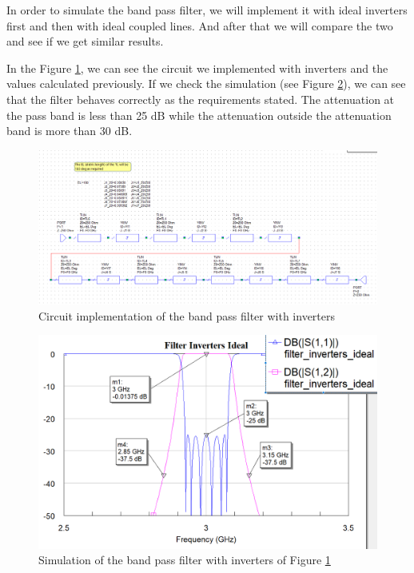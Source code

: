 \documentclass[12pt]{report} %
\begin{document}
In order to simulate the band pass filter, we will implement it with ideal inverters first and then with ideal coupled lines. And after that we will compare the two and see if we get similar results.

In the Figure \ref{fig:design_circuit_elements:band_pass_filter_inverters_circuit}, we can see the circuit we implemented with inverters and the values calculated previously. If we check the simulation (see Figure \ref{fig:design_circuit_elements:band_pass_fitlter_inverters_graph}), we can see that the filter behaves correctly as the requirements stated. The attenuation at the pass band is less than 25 dB while the attenuation outside the attenuation band is more than 30 dB.

\begin{figure}[htbp]
    \centering
    \includegraphics[width=1\linewidth]{images//design_circuit_elements/band_pass_filter_inverters_circuit.png}
    \caption{Circuit implementation of the band pass filter with inverters}
    \label{fig:design_circuit_elements:band_pass_filter_inverters_circuit}
\end{figure}

\begin{figure}[htbp]
    \centering
    \includegraphics[width=1\linewidth]{images//design_circuit_elements/band_pass_fitlter_inverters_graph.png}
    \caption{Simulation of the band pass filter with inverters of Figure \ref{fig:design_circuit_elements:band_pass_filter_inverters_circuit}}
    \label{fig:design_circuit_elements:band_pass_fitlter_inverters_graph}
\end{figure}
\end{document}

